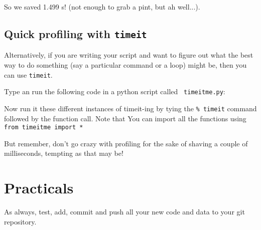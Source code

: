 So we saved 1.499 s! (not enough to grab a pint, but ah well...).

\subsection{Quick profiling with {\tt timeit}}
Alternatively, if you are writing your script and want to figure out 
what the best way to do something (say a particular command or 
a loop) might be, then you can use {\tt timeit}. 

Type an run the following code in a python script called {\tt 
timeitme.py}:



Now run it these different instances of timeit-ing by tying the {\tt \% 
timeit} command followed by the function call. Note that You can import 
all the functions using {\tt from timeitme import *}  

But remember, don't go crazy with profiling for the sake of shaving a 
couple of milliseconds, tempting as that may be!

 



\section{Practicals}

As always, test, add, commit and push all your new code and data to 
your git repository. 

